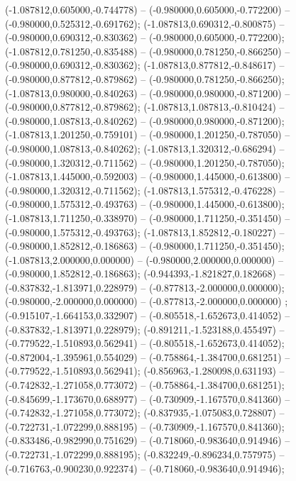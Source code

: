  (-1.087812,0.605000,-0.744778) -- (-0.980000,0.605000,-0.772200) -- (-0.980000,0.525312,-0.691762);
 (-1.087813,0.690312,-0.800875) -- (-0.980000,0.690312,-0.830362) -- (-0.980000,0.605000,-0.772200);
 (-1.087812,0.781250,-0.835488) -- (-0.980000,0.781250,-0.866250) -- (-0.980000,0.690312,-0.830362);
 (-1.087813,0.877812,-0.848617) -- (-0.980000,0.877812,-0.879862) -- (-0.980000,0.781250,-0.866250);
 (-1.087813,0.980000,-0.840263) -- (-0.980000,0.980000,-0.871200) -- (-0.980000,0.877812,-0.879862);
 (-1.087813,1.087813,-0.810424) -- (-0.980000,1.087813,-0.840262) -- (-0.980000,0.980000,-0.871200);
 (-1.087813,1.201250,-0.759101) -- (-0.980000,1.201250,-0.787050) -- (-0.980000,1.087813,-0.840262);
 (-1.087813,1.320312,-0.686294) -- (-0.980000,1.320312,-0.711562) -- (-0.980000,1.201250,-0.787050);
 (-1.087813,1.445000,-0.592003) -- (-0.980000,1.445000,-0.613800) -- (-0.980000,1.320312,-0.711562);
 (-1.087813,1.575312,-0.476228) -- (-0.980000,1.575312,-0.493763) -- (-0.980000,1.445000,-0.613800);
 (-1.087813,1.711250,-0.338970) -- (-0.980000,1.711250,-0.351450) -- (-0.980000,1.575312,-0.493763);
 (-1.087813,1.852812,-0.180227) -- (-0.980000,1.852812,-0.186863) -- (-0.980000,1.711250,-0.351450);
 (-1.087813,2.000000,0.000000) -- (-0.980000,2.000000,0.000000) -- (-0.980000,1.852812,-0.186863);
 (-0.944393,-1.821827,0.182668) -- (-0.837832,-1.813971,0.228979) -- (-0.877813,-2.000000,0.000000);
 (-0.980000,-2.000000,0.000000) -- (-0.877813,-2.000000,0.000000) ;
 (-0.915107,-1.664153,0.332907) -- (-0.805518,-1.652673,0.414052) -- (-0.837832,-1.813971,0.228979);
 (-0.891211,-1.523188,0.455497) -- (-0.779522,-1.510893,0.562941) -- (-0.805518,-1.652673,0.414052);
 (-0.872004,-1.395961,0.554029) -- (-0.758864,-1.384700,0.681251) -- (-0.779522,-1.510893,0.562941);
 (-0.856963,-1.280098,0.631193) -- (-0.742832,-1.271058,0.773072) -- (-0.758864,-1.384700,0.681251);
 (-0.845699,-1.173670,0.688977) -- (-0.730909,-1.167570,0.841360) -- (-0.742832,-1.271058,0.773072);
 (-0.837935,-1.075083,0.728807) -- (-0.722731,-1.072299,0.888195) -- (-0.730909,-1.167570,0.841360);
 (-0.833486,-0.982990,0.751629) -- (-0.718060,-0.983640,0.914946) -- (-0.722731,-1.072299,0.888195);
 (-0.832249,-0.896234,0.757975) -- (-0.716763,-0.900230,0.922374) -- (-0.718060,-0.983640,0.914946);

